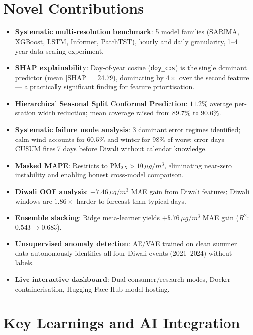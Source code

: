 \documentclass[11pt,a4paper]{article}
\begin{document}
\section{Novel Contributions}
\begin{itemize}
    \item \textbf{Systematic multi-resolution benchmark}: 5 model families (SARIMA, XGBoost, LSTM, Informer, PatchTST), hourly and daily granularity, 1--4 year data-scaling experiment.
    \item \textbf{SHAP explainability}: Day-of-year cosine (\texttt{doy\_cos}) is the single dominant predictor (mean $|\text{SHAP}|=24.79$), dominating by $4\times$ over the second feature --- a practically significant finding for feature prioritisation.
    \item \textbf{Hierarchical Seasonal Split Conformal Prediction}: $11.2\%$ average per-station width reduction; mean coverage raised from $89.7\%$ to $90.6\%$.
    \item \textbf{Systematic failure mode analysis}: 3 dominant error regimes identified; calm wind accounts for $60.5\%$ and winter for $98\%$ of worst-error days; CUSUM fires 7 days before Diwali without calendar knowledge.
    \item \textbf{Masked MAPE}: Restricts to PM$_{2.5} > 10\,\mu g/m^3$, eliminating near-zero instability and enabling honest cross-model comparison.
    \item \textbf{Diwali OOF analysis}: $+7.46\,\mu g/m^3$ MAE gain from Diwali features; Diwali windows are $1.86\times$ harder to forecast than typical days.
    \item \textbf{Ensemble stacking}: Ridge meta-learner yields $+5.76\,\mu g/m^3$ MAE gain ($R^2$: $0.543 \to 0.683$).
    \item \textbf{Unsupervised anomaly detection}: AE/VAE trained on clean summer data autonomously identifies all four Diwali events (2021--2024) without labels.
    \item \textbf{Live interactive dashboard}: Dual consumer/research modes, Docker containerisation, Hugging Face Hub model hosting.
\end{itemize}

\section{Key Learnings and AI Integration}
\end{document}
